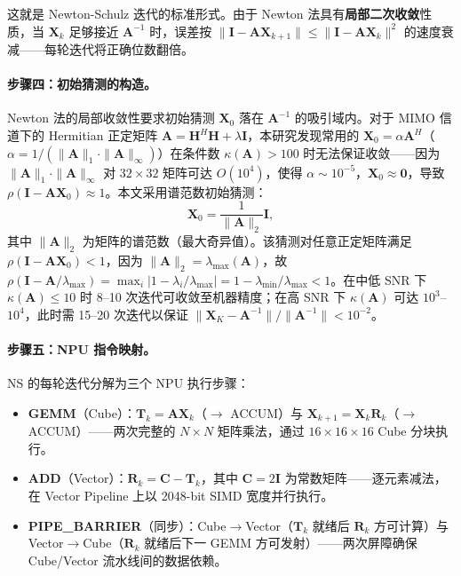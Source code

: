 \documentclass{CjC}
\begin{document}
    这就是 Newton-Schulz 迭代的标准形式。由于 Newton 法具有\textbf{局部二次收敛}性质，当
    $\bm{X}_{k}$ 足够接近 $\bm{A}^{-1}$ 时，误差按
    $\|\bm{I}- \bm{A}\bm{X}_{k+1}\| \leq \|\bm{I}- \bm{A}\bm{X}_{k}\|^{2}$
    的速度衰减——每轮迭代将正确位数翻倍。

    \paragraph{步骤四：初始猜测的构造。}
    Newton 法的局部收敛性要求初始猜测 $\bm{X}_{0}$ 落在 $\bm{A}^{-1}$
    的吸引域内。对于 MIMO 信道下的 Hermitian 正定矩阵
    $\bm{A}=\bm{H}^{H}\bm{H}+\lambda\bm{I}$，本研究发现常用的 $\bm{X}_{0}=\alpha\bm
    {A}^{H}$（$\alpha=1/(\|\bm{A}\|_{1}\cdot\|\bm{A}\|_{\infty})$）在条件数
    $\kappa(\bm{A})>100$ 时无法保证收敛——因为
    $\|\bm{A}\|_{1}\cdot\|\bm{A}\|_{\infty}$ 对 $32\times32$ 矩阵可达
    $O(10^{4})$，使得 $\alpha\sim10^{-5}$，$\bm{X}_{0}\approx\bm{0}$，导致
    $\rho(\bm{I}-\bm{A}\bm{X}_{0})\approx 1$。本文采用谱范数初始猜测：
    \begin{equation}
        \boxed{\bm{X}_0 = \frac{1}{\|\bm{A}\|_{2}}\bm{I}},
    \end{equation}
    其中 $\|\bm{A}\|_{2}$ 为矩阵的谱范数（最大奇异值）。该猜测对任意正定矩阵满足
    $\rho(\bm{I}-\bm{A}\bm{X}_{0})<1$，因为
    $\|\bm{A}\|_{2}=\lambda_{\max}(\bm{A})$，故 $\rho(\bm{I}-\bm{A}/\lambda_{\max}
    ) = \max_{i}|1-\lambda_{i}/\lambda_{\max}| = 1-\lambda_{\min}/\lambda_{\max}<
    1$。在中低 SNR 下 $\kappa(\bm{A})\leqslant 10$ 时 8--10 次迭代可收敛至机器精度；在高
    SNR 下 $\kappa(\bm{A})$ 可达 $10^{3}$--$10^{4}$，此时需 15--20 次迭代以保证
    $\|\bm{X}_{K}-\bm{A}^{-1}\|/\|\bm{A}^{-1}\|<10^{-2}$。

    \paragraph{步骤五：NPU 指令映射。}
    NS 的每轮迭代分解为三个 NPU 执行步骤：
    \begin{itemize}
        \item \textbf{GEMM}（Cube）：$\bm{T}_{k}= \bm{A}\bm{X}_{k}$（$\rightarrow$
            ACCUM）与 $\bm{X}_{k+1}= \bm{X}_{k}\bm{R}_{k}$（$\rightarrow$
            ACCUM）——两次完整的 $N\times N$ 矩阵乘法，通过 $16\times16\times16$
            Cube 分块执行。

        \item \textbf{ADD}（Vector）：$\bm{R}_{k}= \bm{C}- \bm{T}_{k}$，其中 $\bm
            {C}=2\bm{I}$ 为常数矩阵——逐元素减法，在 Vector Pipeline 上以 2048-bit
            SIMD 宽度并行执行。

        \item \textbf{PIPE\_BARRIER}（同步）：Cube$\rightarrow$Vector（$\bm{T}_{k}$
            就绪后 $\bm{R}_{k}$ 方可计算）与 Vector$\rightarrow$Cube（$\bm{R}_{k}$
            就绪后下一 GEMM 方可发射）——两次屏障确保 Cube/Vector 流水线间的数据依赖。
    \end{itemize}
\end{document}
